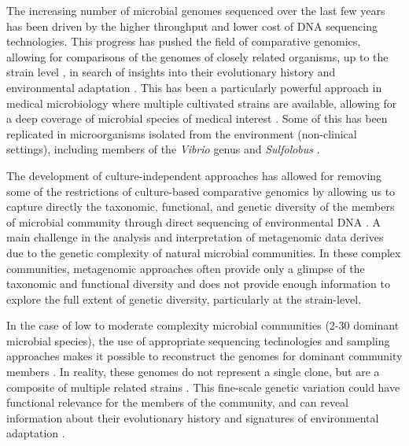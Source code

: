 The increasing number of microbial genomes sequenced over the last few years has been driven by the higher throughput and lower cost of DNA sequencing technologies. This progress has pushed the field of comparative genomics, allowing for comparisons of the genomes of closely related organisms, up to the strain level  \cite{Fricke:2011gy,Doroghazi:2013gf,Grad:2013tc,Reno:2009bq}, in search of insights into their evolutionary history and environmental adaptation \cite{Reno:2009bq,ZhuofeiXu:2011fp}. This has been a particularly powerful approach in medical microbiology where multiple cultivated strains are available, allowing for a deep coverage of microbial species of medical interest \cite{Feero:2011fr}. Some of this has been replicated in microorganisms isolated from the environment (non-clinical settings), including members of the \textit{Vibrio} genus \cite{Cordero:2012ik} and \textit{Sulfolobus} \cite{Reno:2009bq}.

The development of culture-independent approaches has allowed for removing some of the restrictions of culture-based comparative genomics by allowing us to capture directly the taxonomic, functional, and genetic diversity of the members of microbial community through direct sequencing of environmental DNA \cite{Bragg:2014kv}. A main challenge in the analysis and interpretation of metagenomic data derives due to the genetic complexity of natural microbial communities. In these complex communities, metagenomic approaches often provide only a glimpse of the taxonomic and functional diversity and does not provide enough information to explore the full extent of genetic diversity, particularly at the strain-level.

In the case of low to moderate complexity microbial communities (2-30 dominant microbial species), the use of appropriate sequencing technologies and sampling approaches makes it possible to reconstruct the genomes for dominant community members \cite{Bragg:2014kv}. In reality, these genomes do not represent a single clone, but are a composite of multiple related strains \cite{Podell:2013kx,Allen:2005dg}. This fine-scale genetic variation could have functional relevance for the members of the community, and can reveal information about their evolutionary history and signatures of environmental adaptation \cite{Lo:2007ht,Hemme:2010ds,Palenik:2009kx}.

